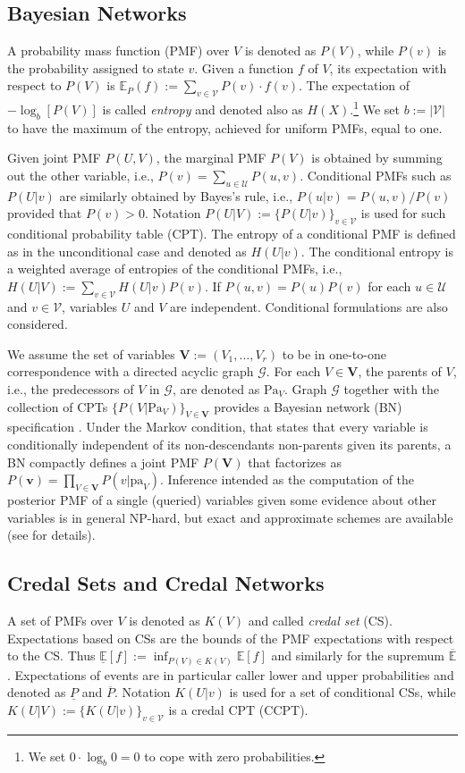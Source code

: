 \documentclass[runningheads]{llncs}
\begin{document}
\subsection{Bayesian Networks}
A probability mass function (PMF) over $V$ is denoted as $P(V)$, while $P(v)$ is the probability assigned to state $v$. Given a function $f$ of $V$, its expectation with respect to $P(V)$ is $\mathbb{E}_P(f):=\sum_{v\in\mathcal{V}} P(v) \cdot f(v)$. The expectation of $-\log_b[P(V)]$ is called \emph{entropy} and denoted also as $H(X)$.\footnote{We set $0 \cdot \log_b 0 = 0$ to cope with zero probabilities.} We set $b:=|\mathcal{V}|$ to have the maximum of the entropy, achieved for uniform PMFs, equal to one.

Given joint PMF $P(U,V)$, the marginal PMF $P(V)$ is obtained by summing out the other variable, i.e., $P(v)=\sum_{u\in\mathcal{U}} P(u,v)$. Conditional PMFs such as $P(U|v)$ are similarly obtained by Bayes's rule, i.e., $P(u|v)=P(u,v)/P(v)$ provided that $P(v)>0$. Notation $P(U|V):=\{P(U|v)\}_{v\in\mathcal{V}}$ is used for such conditional probability table (CPT). The entropy of a conditional PMF is defined as in the unconditional case and denoted as $H(U|v)$. The conditional entropy is a weighted average of entropies of the conditional PMFs, i.e., $H(U|V):=\sum_{v\in\mathcal{V}} H(U|v) P(v)$. If $P(u,v)=P(u) P(v)$ for each $u\in\mathcal{U}$ and $v\in\mathcal{V}$, variables $U$ and $V$ are independent. Conditional formulations are also considered.

We assume the set of variables $\bm{V}:=(V_1,\ldots,V_r)$ to be in one-to-one correspondence with a directed acyclic graph $\mathcal{G}$. For each $V\in\bm{V}$, the parents of $V$, i.e., the predecessors of $V$ in  $\mathcal{G}$, are denoted as $\mathrm{Pa}_V$. Graph $\mathcal{G}$ together with the collection of CPTs $\{P(V|\mathrm{Pa}_V)\}_{V\in\bm{V}}$ provides a Bayesian network (BN) specification \cite{koller2009}. Under the Markov condition, that states that every variable is conditionally independent of its non-descendants non-parents given its parents, a BN compactly defines a joint PMF $P(\bm{V})$ that factorizes as $P(\bm{v})=\prod_{V\in\bm{V}} P(v|\mathrm{pa}_V)$. Inference intended as the computation of the posterior PMF of a single (queried) variables given some evidence about other variables is in general NP-hard, but exact and approximate schemes are available (see \cite{koller2009} for details).

\subsection{Credal Sets and Credal Networks}
A set of PMFs over $V$ is denoted as $K(V)$ and called \emph{credal set} (CS). Expectations based on CSs are the bounds of the PMF expectations with respect to the CS. Thus $\underline{\mathbb{E}}[f]:=\inf_{P(V)\in K(V)} \mathbb{E}[f]$ and similarly for the supremum $\overline{\mathbb{E}}$. Expectations of events are in particular caller lower and upper probabilities and denoted as $\underline{P}$ and $\overline{P}$. Notation $K(U|v)$ is used for a set of conditional CSs, while $K(U|V):=\{K(U|v)\}_{v\in\mathcal{V}}$ is a credal CPT (CCPT).
\end{document}
